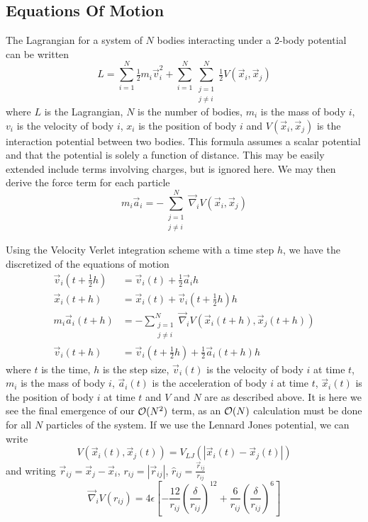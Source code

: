 %
%
\subsection{Equations Of Motion}

The Lagrangian for a system of $N$ bodies
interacting under a 2-body potential can be written
\begin{equation}
    L = \sum_{i=1}^N \tfrac{1}{2} m_i \vec{v}_i^2
        + \sum_{i=1}^N \sum_{\substack{j=1\\j\ne{}i}}^N
            \tfrac{1}{2} V(\vec{x}_i, \vec{x}_j)
\end  {equation}
where $L$ is the Lagrangian,
$N$ is the number of bodies,
$m_i$ is the mass of body $i$,
$v_i$ is the velocity of body $i$,
$x_i$ is the position of body $i$ and
$V(\vec{x}_i, \vec{x}_j)$ is the interaction potential between two bodies.
This formula assumes a scalar potential and
that the potential is solely a function of distance.
%
This may be easily extended include terms involving charges,
but is ignored here.
%
We may then derive the force term for each particle
\begin{equation}
    m_i \vec{a}_i = -\sum_{\substack{j=1\\j\ne{}i}}^N
                    \vec{\nabla}_i V(\vec{x}_i, \vec{x}_j)
\end  {equation}


Using the Velocity Verlet integration scheme with a time step $h$,
we have the discretized of the equations of motion
\begin{align}
    \vec{v}_i(t + \tfrac{1}{2} h) &=
        \vec{v}_i(t) + \tfrac{1}{2}\vec{a}_i h
    \\
    \vec{x}_i(t + h) &=
        \vec{x}_i(t) + \vec{v}_i(t + \tfrac{1}{2} h) h
    \\
    m_i \vec{a}_i(t + h) &=
        - \sum_{\substack{j=1\\j\ne{}i}}^N
            \vec{\nabla}_i V(\vec{x}_i(t+h), \vec{x}_j(t+h))
    \\
    \vec{v}_i(t+h) &=
        \vec{v}_i(t + \tfrac{1}{2} h) + \tfrac{1}{2} \vec{a}_i(t + h) h
\end  {align}
where $t$ is the time,
$h$ is the step size,
$\vec{v}_i(t)$ is the velocity of body $i$ at time $t$,
$m_i$ is the mass of body $i$,
$\vec{a}_i(t)$ is the acceleration of body $i$ at time $t$,
$\vec{x}_i(t)$ is the position of body $i$ at time $t$ and
$V$ and $N$ are as described above.
%
It is here we see the final emergence of our $\mathcal{O}{(N^2)}$ term,
as an $\mathcal{O}{(N)}$ calculation must be done for
all $N$ particles of the system.
If we use the Lennard Jones potential, we can write
\begin{equation}
    V(\vec{x}_i(t), \vec{x}_j(t)) = V_{LJ}(|\vec{x}_i(t) - \vec{x}_j(t)|)
\end  {equation}
and writing $\vec{r}_{ij} = \vec{x}_j - \vec{x}_i$,
$r_{ij} = |\vec{r}_{ij}|$, $\hat{r}_{ij} = \frac{\vec{r}_{ij}}{r_{ij}}$
\begin{equation}
    \vec{\nabla}_i V(r_{ij}) = 4\epsilon \left[
        - \frac{12}{r_{ij}} \left( \frac{\delta}{r_{ij}} \right)^{12}
        + \frac{6}{r_{ij}} \left( \frac{\delta}{r_{ij}} \right)^{6}
    \right]
\end  {equation}
